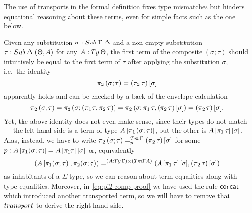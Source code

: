 \documentclass[a4paper,UKenglish,numberwithinsect,cleveref,thm-restate]{lipics-v2021}
\begin{document}
The use of transports in the formal definition fixes type mismatches but hinders equational reasoning about these terms, even for simple facts such as the one below.
\begin{example}\label{ex:pi2-comp}
  Given any substitution $\sigma : \Sub\;\Gamma\; \Delta$ and a non-empty substitution $\tau : \Sub\;\Delta\;(\Theta, A)$ for any $A : \Ty\,\Theta$, the first term of the composite $(\sigma; \tau)$ should intuitively be equal to the first term of $\tau$ after applying the substitution $\sigma$, i.e.\ the identity
  \[
    \pi_2\,(\sigma ; \tau) = {(\pi_2\,\tau)}\,[\sigma]
  \]
  apparently holds and can be checked by a back-of-the-envelope calculation
  \begin{equation} \label{eq:pi2-comp-proof}
    \pi_2\,(\sigma ; \tau) 
    = \pi_2\,(\sigma; (\pi_1\,\tau, \pi_2\,\tau))
    = \pi_2\,(\sigma;\pi_1\,\tau, {(\pi_2\,\tau)}\,[\sigma])
    = {(\pi_2\,\tau)}\,[\sigma].
  \end{equation}
  Yet, the above identity does not even make sense, since their types do not match --- the left-hand side is a term of type ${A}\,[\pi_1\,(\sigma;\tau)]$, but the other is ${{A}\,[\pi_1\,\tau]}\,[\sigma]$.
  Alas, instead, we have to write $\pi_2\,(\sigma ; \tau) =^{\Tm\,\Gamma}_{p} \sub{(\pi_2\,\tau)}{\sigma}$ for some $p: {A}\,[\pi_1(\sigma; \tau)] = {{A}\,[\pi_1\tau]}\,[\sigma]$ or, equivalently
  \begin{equation}\label{eq:pi2-comp-real-proof}
    (\sub{A}{\pi_1(\sigma; \tau)}, \pi_2(\sigma; \tau)) =^{(A : \Ty\,\Gamma) \times (\Tm \Gamma A)} (\sub{\sub{A}{\pi_1\,\tau}}{\sigma}, \sub{(\pi_2\,\tau)}{\sigma})
  \end{equation}
  as inhabitants of a $\Sigma$-type, so we can reason about term equalities along with type equalities.
  Moreover, in~\eqref{eq:pi2-comp-proof} we have used the rule $\mathsf{concat}$ which introduced another transported term, so we will have to remove that $\transp$ to derive the right-hand side.


\end{example}
\end{document}
